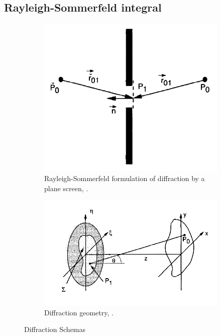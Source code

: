 \subsection{Rayleigh-Sommerfeld integral}
\label{subsec:Ray_Som_int}

\begin{figure}
\centering
    \begin{subfigure}{0.4\textwidth}
        \includegraphics[width=\textwidth]{Figures/Ray_Som_Diff}
        \caption{Rayleigh-Sommerfeld formulation of diffraction by a plane screen, \citep[Chapter 3.5]{goodman_1968}.}
        \label{subfig:Ray_Som_Diff}
    \end{subfigure}
    \quad
    \begin{subfigure}{0.5\textwidth}
        \includegraphics[width=\textwidth]{Figures/Diff_Geom}
        \caption{Diffraction geometry, \citep[Chapter 4.1]{goodman_1968}.}
        \label{subfig:Diff_Geom}
    \end{subfigure}
    \decoRule
    \caption{Diffraction Schemas}
    \label{fig:Diff_Schemas}
\end{figure}

